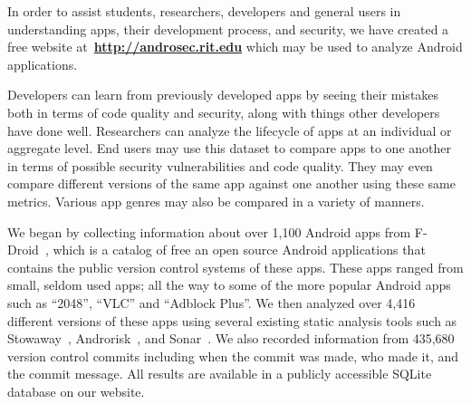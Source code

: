 







%


 In order to assist students, researchers, developers and general users in understanding apps, their development process, and security, we have created a free website at~\textbf{\url{http://androsec.rit.edu}} which may be used to analyze Android applications.

Developers can learn from previously developed apps by seeing their mistakes both in terms of code quality and security, along with things other developers have done well. Researchers can analyze the lifecycle of apps at an individual or aggregate level. End users may use this dataset to compare apps to one another in terms of possible security vulnerabilities and code quality. They may even compare different versions of the same app against one another using these same metrics. Various app genres may also be compared in a variety of manners. 

We began by collecting information about over 1,100 Android apps from F-Droid~\cite{fdroid_url}, which is a catalog of free an open source Android applications that contains the public version control systems of these apps. These apps ranged from small, seldom used apps; all the way to some of the more popular Android apps such as ``2048'', ``VLC''  and ``Adblock Plus''. We then analyzed over 4,416 different versions of these apps using several  existing static analysis tools such as Stowaway~\cite{Felt:2011:APD:2046707.2046779}, Androrisk~\cite{androguard_url}, and Sonar~\cite{sonar_qube_url}. We also recorded information from 435,680 version control commits including when the commit was made, who made it, and the commit message. All results are available in a publicly accessible SQLite database on our website.

